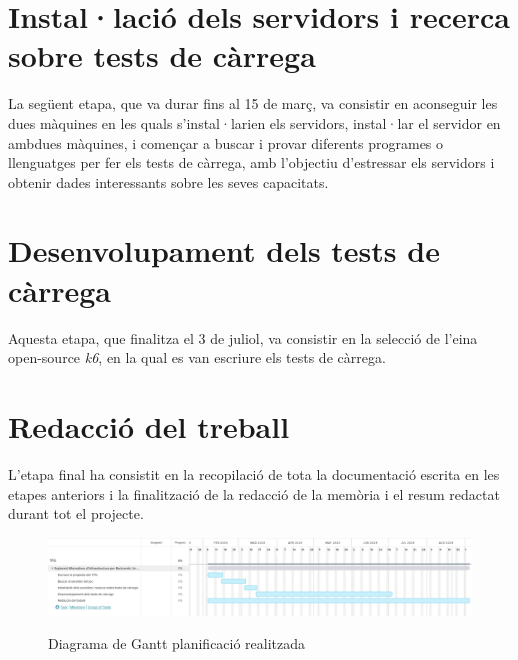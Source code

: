 \section{Instal·lació dels servidors i recerca sobre tests de càrrega}

La següent etapa, que va durar fins al 15 de març, va consistir en aconseguir les dues màquines en les quals s'instal·larien els servidors, instal·lar el servidor en ambdues màquines, i començar a buscar i provar diferents programes o llenguatges per fer els tests de càrrega, amb l'objectiu d'estressar els servidors i obtenir dades interessants sobre les seves capacitats.

\section{Desenvolupament dels tests de càrrega}

Aquesta etapa, que finalitza el 3 de juliol, va consistir en la selecció de l'eina open-source \textit{k6}, en la qual es van escriure els tests de càrrega.

\section{Redacció del treball}

L'etapa final ha consistit en la recopilació de tota la documentació escrita en les etapes anteriors i la  finalització de la redacció de la memòria i el resum redactat durant tot el projecte.


\begin{figure}[!htbp]
    \includegraphics[scale=0.30]{Imatges/Diagrama de Gantt.png}
    \label{fig:DiagramaGant}
    \caption{Diagrama de Gantt planificació realitzada}
    
\end{figure}
